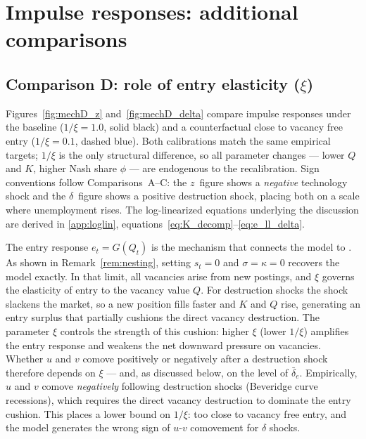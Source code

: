 \documentclass[authoryear, review, 12pt]{elsarticle}
\begin{document}
\section{Impulse responses: additional comparisons}
\label{app:additional_comparisons}

\subsection{Comparison D: role of entry elasticity ($\xi$)}
\label{app:comparison_D}

Figures~\ref{fig:mechD_z} and~\ref{fig:mechD_delta} compare impulse
responses under the baseline ($1/\xi=1.0$, solid black) and a
counterfactual close to vacancy free entry ($1/\xi=0.1$, dashed blue).
Both calibrations match the same empirical targets; $1/\xi$
is the only structural difference, so all parameter changes --- lower $Q$
and $K$, higher Nash share $\phi$ --- are endogenous to the recalibration.
Sign conventions follow Comparisons~A--C: the $z$~figure shows a
\emph{negative} technology shock and the $\delta$~figure shows a positive
destruction shock, placing both on a scale where unemployment rises.
The log-linearized equations underlying the discussion are derived in
\ref{app:loglin}, equations~\eqref{eq:K_decomp}--\eqref{eq:e_ll_delta}.

The entry response $e_t=G(Q_t)$ is the mechanism that connects the
model to \citet{coles_2018}.  As shown in
Remark~\ref{rem:nesting}, setting $s_t=0$ and $\sigma=\kappa=0$ recovers
the \citeauthor{coles_2018} model exactly.  In that limit, all vacancies
arise from new postings, and $\xi$ governs the elasticity of entry to the
vacancy value $Q$.  For destruction shocks the shock slackens the market,
so a new position fills faster and $K$ and $Q$ rise, generating an entry
surplus that partially cushions the direct vacancy destruction.  The parameter $\xi$ controls the strength of this
cushion: higher $\xi$ (lower $1/\xi$) amplifies the entry
response and weakens the net downward pressure on vacancies.
Whether $u$ and $v$ comove positively or negatively after a destruction
shock therefore depends on $\xi$ --- and, as discussed below, on the
level of $\bar\delta_e$.  Empirically, $u$ and $v$ comove
\emph{negatively} following destruction shocks (Beveridge curve
recessions), which requires the direct vacancy destruction to dominate
the entry cushion.  This places a lower bound on $1/\xi$:
too close to vacancy free entry, and the model generates the wrong sign of
$u$-$v$ comovement for $\delta$ shocks.
\end{document}
